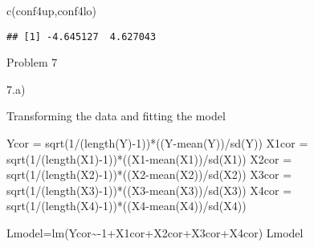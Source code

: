 \documentclass[
]{article}
\newenvironment{Shaded}{\begin{snugshade}}{\end{snugshade}}
\newcommand{\DecValTok}[1]{\textcolor[rgb]{0.00,0.00,0.81}{#1}}
\newcommand{\FunctionTok}[1]{\textcolor[rgb]{0.00,0.00,0.00}{#1}}
\newcommand{\NormalTok}[1]{#1}
\newcommand{\OtherTok}[1]{\textcolor[rgb]{0.56,0.35,0.01}{#1}}
\newcommand{\SpecialCharTok}[1]{\textcolor[rgb]{0.00,0.00,0.00}{#1}}
\begin{document}
\begin{Shaded}
\begin{Highlighting}[]
\FunctionTok{c}\NormalTok{(conf4up,conf4lo)}
\end{Highlighting}
\end{Shaded}

\begin{verbatim}
## [1] -4.645127  4.627043
\end{verbatim}

Problem 7

7.a)

Transforming the data and fitting the model

\begin{Shaded}
\begin{Highlighting}[]
\NormalTok{Ycor  }\OtherTok{=} \FunctionTok{sqrt}\NormalTok{(}\DecValTok{1}\SpecialCharTok{/}\NormalTok{(}\FunctionTok{length}\NormalTok{(Y)}\SpecialCharTok{{-}}\DecValTok{1}\NormalTok{))}\SpecialCharTok{*}\NormalTok{((Y}\SpecialCharTok{{-}}\FunctionTok{mean}\NormalTok{(Y))}\SpecialCharTok{/}\FunctionTok{sd}\NormalTok{(Y))}
\NormalTok{X1cor }\OtherTok{=} \FunctionTok{sqrt}\NormalTok{(}\DecValTok{1}\SpecialCharTok{/}\NormalTok{(}\FunctionTok{length}\NormalTok{(X1)}\SpecialCharTok{{-}}\DecValTok{1}\NormalTok{))}\SpecialCharTok{*}\NormalTok{((X1}\SpecialCharTok{{-}}\FunctionTok{mean}\NormalTok{(X1))}\SpecialCharTok{/}\FunctionTok{sd}\NormalTok{(X1))}
\NormalTok{X2cor }\OtherTok{=} \FunctionTok{sqrt}\NormalTok{(}\DecValTok{1}\SpecialCharTok{/}\NormalTok{(}\FunctionTok{length}\NormalTok{(X2)}\SpecialCharTok{{-}}\DecValTok{1}\NormalTok{))}\SpecialCharTok{*}\NormalTok{((X2}\SpecialCharTok{{-}}\FunctionTok{mean}\NormalTok{(X2))}\SpecialCharTok{/}\FunctionTok{sd}\NormalTok{(X2))}
\NormalTok{X3cor }\OtherTok{=} \FunctionTok{sqrt}\NormalTok{(}\DecValTok{1}\SpecialCharTok{/}\NormalTok{(}\FunctionTok{length}\NormalTok{(X3)}\SpecialCharTok{{-}}\DecValTok{1}\NormalTok{))}\SpecialCharTok{*}\NormalTok{((X3}\SpecialCharTok{{-}}\FunctionTok{mean}\NormalTok{(X3))}\SpecialCharTok{/}\FunctionTok{sd}\NormalTok{(X3))}
\NormalTok{X4cor }\OtherTok{=} \FunctionTok{sqrt}\NormalTok{(}\DecValTok{1}\SpecialCharTok{/}\NormalTok{(}\FunctionTok{length}\NormalTok{(X4)}\SpecialCharTok{{-}}\DecValTok{1}\NormalTok{))}\SpecialCharTok{*}\NormalTok{((X4}\SpecialCharTok{{-}}\FunctionTok{mean}\NormalTok{(X4))}\SpecialCharTok{/}\FunctionTok{sd}\NormalTok{(X4))}

\NormalTok{Lmodel}\OtherTok{=}\FunctionTok{lm}\NormalTok{(Ycor}\SpecialCharTok{\textasciitilde{}{-}}\DecValTok{1}\SpecialCharTok{+}\NormalTok{X1cor}\SpecialCharTok{+}\NormalTok{X2cor}\SpecialCharTok{+}\NormalTok{X3cor}\SpecialCharTok{+}\NormalTok{X4cor)}
\NormalTok{Lmodel}
\end{Highlighting}
\end{Shaded}
\end{document}
